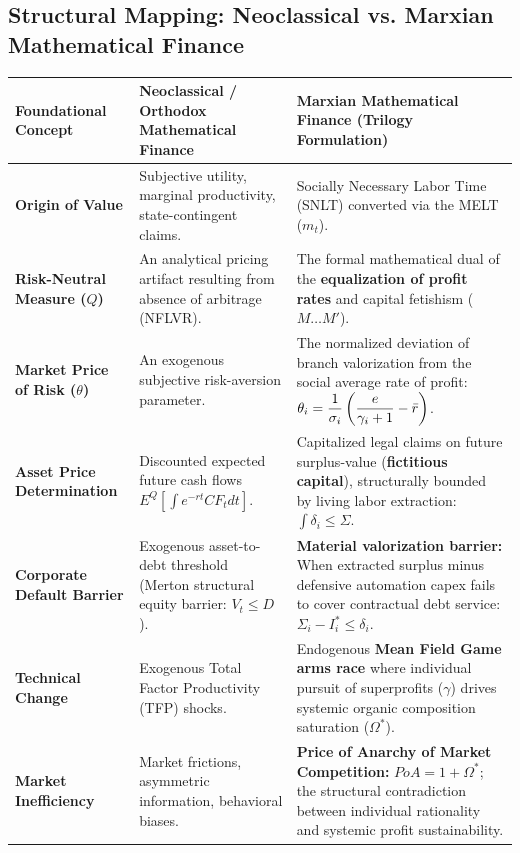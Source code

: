 \documentclass[11pt,letterpaper]{report}
\newcommand{\fitmath}[1]{\begingroup\setbox0=\hbox{$\displaystyle #1$}\ifdim\wd0>\linewidth\resizebox{\linewidth}{!}{$\displaystyle #1$}\else\displaystyle #1\fi\endgroup}
\begin{document}
\subsection{Structural Mapping: Neoclassical vs. Marxian Mathematical Finance}
\begingroup\small\begin{longtable}{|>{\raggedright\arraybackslash}p{}|>{\raggedright\arraybackslash}p{}|>{\raggedright\arraybackslash}p{}|}\hline
Foundational Concept & Neoclassical / Orthodox Mathematical Finance & Marxian Mathematical Finance (Trilogy Formulation) \\ \hline
\textbf{Origin of Value} & Subjective utility, marginal productivity, state-contingent claims. & Socially Necessary Labor Time (SNLT) converted via the MELT (${m}_{t}$). \\ \hline
\textbf{Risk-Neutral Measure ($Q$)} & An analytical pricing artifact resulting from absence of arbitrage (NFLVR). & The formal mathematical dual of the \textbf{equalization of profit rates} and capital fetishism ($M \dots M'$). \\ \hline
\textbf{Market Price of Risk ($\theta$)} & An exogenous subjective risk-aversion parameter. & The normalized deviation of branch valorization from the social average rate of profit: $\fitmath{{\theta }_{i}=\frac{1}{{\sigma }_{i}}\left({\frac{e}{{\gamma }_{i}+1}-\bar{r}}\right)}$. \\ \hline
\textbf{Asset Price Determination} & Discounted expected future cash flows ${E}^{Q}[\int{e}^{-rt}C{F}_{t}dt]$. & Capitalized legal claims on future surplus-value (\textbf{fictitious capital}), structurally bounded by living labor extraction: $\int{\delta }_{i}\leq \Sigma$. \\ \hline
\textbf{Corporate Default Barrier} & Exogenous asset-to-debt threshold (Merton structural equity barrier: ${V}_{t}\leq D$). & \textbf{Material valorization barrier:} When extracted surplus minus defensive automation capex fails to cover contractual debt service: ${\Sigma }_{i}-{I}_{i}^{*}\leq {\delta }_{i}$. \\ \hline
\textbf{Technical Change} & Exogenous Total Factor Productivity (TFP) shocks. & Endogenous \textbf{Mean Field Game arms race} where individual pursuit of superprofits ($\gamma$) drives systemic organic composition saturation (${\Omega }^{*}$). \\ \hline
\textbf{Market Inefficiency} & Market frictions, asymmetric information, behavioral biases. & \textbf{Price of Anarchy of Market Competition:} $PoA=1+{\Omega }^{*}$; the structural contradiction between individual rationality and systemic profit sustainability. \\ \hline

\end{longtable}
\end{document}
